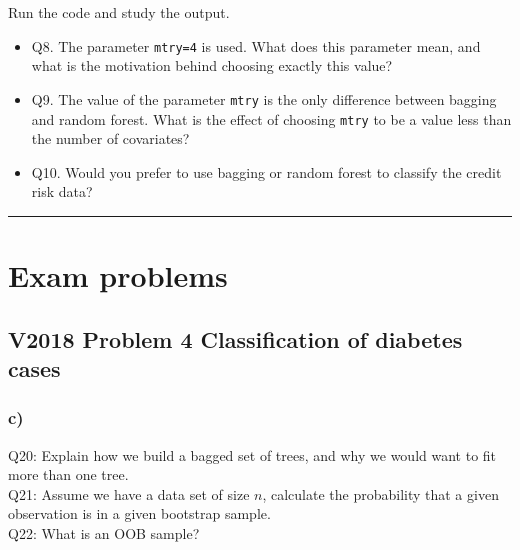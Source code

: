 \documentclass[]{article}
\providecommand{\tightlist}{%
  \setlength{\itemsep}{0pt}\setlength{\parskip}{0pt}}
\begin{document}
Run the code and study the output.

\begin{itemize}
\tightlist
\item
  Q8. The parameter \texttt{mtry=4} is used. What does this parameter
  mean, and what is the motivation behind choosing exactly this value?
\item
  Q9. The value of the parameter \texttt{mtry} is the only difference
  between bagging and random forest. What is the effect of choosing
  \texttt{mtry} to be a value less than the number of covariates?
\item
  Q10. Would you prefer to use bagging or random forest to classify the
  credit risk data?
\end{itemize}

\begin{center}\rule{0.5\linewidth}{\linethickness}\end{center}

\section{Exam problems}\label{exam-problems}

\subsection{V2018 Problem 4 Classification of diabetes
cases}\label{v2018-problem-4-classification-of-diabetes-cases}

\subsubsection{c)}\label{c}

Q20: Explain how we build a bagged set of trees, and why we would want
to fit more than one tree.\\
Q21: Assume we have a data set of size \(n\), calculate the probability
that a given observation is in a given bootstrap sample.\\
Q22: What is an OOB sample?
\end{document}

